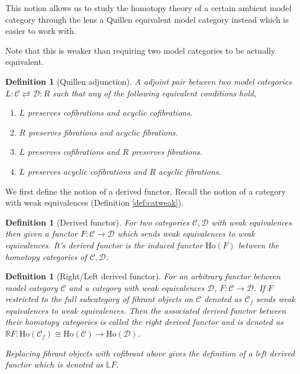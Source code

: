 \documentclass[12pt]{report}
\numberwithin{equation}{section}
\newtheorem{definition}[dummy]{Definition}
\begin{document}
	This notion allows us to study the homotopy theory of a certain ambient model category through the lens a Quillen equivalent model category instead which is easier to work with.
	
	Note that this is weaker than requiring two model categories to be actually equivalent.
	
	\begin{definition}[Quillen adjunction]
		A adjoint pair between two model categories \( L:\mathcal{C} \rightleftarrows \mathcal{D}: R \) such that any of the following equivalent conditions hold,
		\begin{enumerate}
			\item \( L \) preserves cofibrations and acyclic cofibrations.
			\item \( R \) preserves fibrations and acyclic fibrations.
			\item \( L \) preserves cofibrations and \( R \) preserves fibrations.
			\item \( L \) preserves acyclic cofibrations and \( R \) acyclic fibrations.
		\end{enumerate}
	\end{definition}
	
	We first define the notion of a derived functor. Recall the notion of a category with weak equivalences (Definition \ref{def:catweak}).
	
	\begin{definition}[Derived functor]
		For two categories \( \mathcal{C, D} \) with weak equivalences then given a functor \( F:\mathcal{C} \to \mathcal{D} \) which sends weak equivalences to weak equivalences. It's derived functor is the induced functor \( \mathrm{Ho}(F) \) between the homotopy categories of \( \mathcal{C, D} \).
	\end{definition}
	
	\begin{definition}[Right/Left derived functor]
		For an arbitrary functor between model category \( \mathcal{C} \) and a category with weak equivalences \( \mathcal{D} \), \( F: \mathcal{C} \to \mathcal{D} \).
		If \( F \) restricted to the full subcategory of fibrant objects on \( \mathcal{C} \) denoted as \( \mathcal{C}_f \) sends weak equivalences to weak equivalences. Then the associated derived functor between their homotopy categories is called the right derived functor and is denoted as \( \mathbb{R}F: \mathrm{Ho}(\mathcal{C}_f)\cong \mathrm{Ho}(\mathcal{C}) \to \mathrm{Ho}(\mathcal{D})  \). 
		
		Replacing fibrant objects with cofibrant above gives the definition of a left derived functor which is denoted as \( \mathbb{L}F \).
	\end{definition}
	
\end{document}
